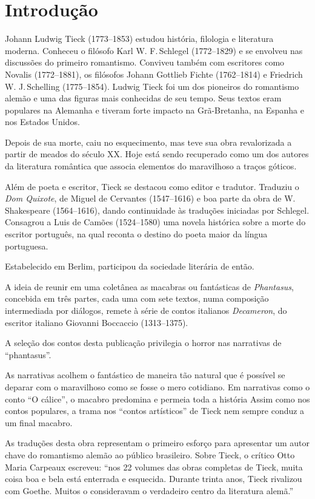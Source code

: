 \documentclass[11pt]{extarticle}
\begin{document}
\tableofcontents

\section{Introdução}

Johann Ludwig Tieck (1773--1853) estudou história, filologia e literatura moderna.
Conheceu o filósofo Karl W. F.\,Schlegel (1772--1829) e se envolveu nas discussões do primeiro romantismo. 
Conviveu também com escritores como 
Novalis (1772--1881), 
os filósofos 
Johann Gottlieb Fichte (1762--1814) e 
Friedrich W. J.\,Schelling (1775--1854). 
Ludwig Tieck foi um dos pioneiros do romantismo alemão e uma das figuras mais conhecidas de seu tempo. 
Seus textos eram populares na Alemanha e tiveram forte impacto na Grã-Bretanha, na Espanha e nos Estados Unidos.

Depois de sua morte, caiu no esquecimento, mas teve sua obra revalorizada a partir de meados do século XX. 
Hoje está sendo recuperado como um dos autores da literatura romântica que associa elementos do maravilhoso a traços góticos.

Além de poeta e escritor, Tieck se destacou como editor e tradutor.
Traduziu o \textit{Dom Quixote}, de Miguel de Cervantes (1547--1616) e boa parte da obra de 
W.\,Shakespeare (1564--1616), dando continuidade às traduções iniciadas por Schlegel.
Consagrou a Luis de Camões (1524–1580) uma novela histórica sobre a morte 
do escritor português, na qual reconta o destino do poeta maior da língua portuguesa.

Estabelecido em Berlim, participou da sociedade literária de então.

A ideia de reunir em uma coletânea as macabras ou fantásticas de 
\textit{Phantasus}, concebida em três partes, cada uma com sete textos,
numa composição intermediada por diálogos, remete à série de contos italianos \textit{Decameron}, do escritor italiano Giovanni Boccaccio (1313--1375). 

A seleção dos contos desta publicação privilegia o horror nas narrativas de “phantasus”. 

As narrativas acolhem o fantástico de maneira tão natural que é possível 
se deparar com o maravilhoso como se fosse o mero cotidiano. 
Em narrativas como o conto “O cálice”, o macabro predomina e permeia toda a história
Assim como nos contos populares, a trama nos “contos artísticos” de Tieck nem sempre conduz a um final macabro. 

As traduções desta obra representam o primeiro esforço para apresentar um autor chave do romantismo alemão ao público brasileiro. Sobre Tieck, o crítico Otto Maria Carpeaux escreveu: “nos 22 volumes das obras completas de Tieck, muita coisa boa e bela está enterrada e esquecida. Durante trinta anos, Tieck rivalizou com Goethe. 
Muitos o consideravam o verdadeiro centro da literatura alemã.”
\end{document}
